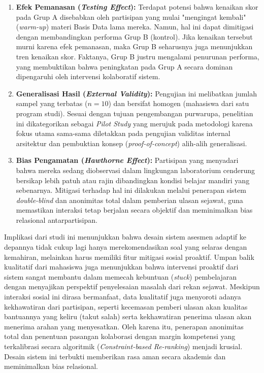 \begin{enumerate}
    \item \textbf{Efek Pemanasan (\textit{Testing Effect}):} Terdapat potensi bahwa kenaikan skor pada Grup A disebabkan oleh partisipan yang mulai "mengingat kembali" (\textit{warm-up}) materi Basis Data lama mereka. Namun, hal ini dapat dimitigasi dengan membandingkan performa Grup B (kontrol). Jika kenaikan tersebut murni karena efek pemanasan, maka Grup B seharusnya juga menunjukkan tren kenaikan skor. Faktanya, Grup B justru mengalami penurunan performa, yang membuktikan bahwa peningkatan pada Grup A secara dominan dipengaruhi oleh intervensi kolaboratif sistem.
    
    \item \textbf{Generalisasi Hasil (\textit{External Validity}):} Pengujian ini melibatkan jumlah sampel yang terbatas ($n=10$) dan bersifat homogen (mahasiswa dari satu program studi). Sesuai dengan tujuan pengembangan purwarupa, penelitian ini dikategorikan sebagai \textit{Pilot Study} yang merujuk pada metodologi \textcite{Sukserm2024} karena fokus utama sama-sama diletakkan pada pengujian validitas internal arsitektur dan pembuktian konsep (\textit{proof-of-concept}) alih-alih generalisasi.
    
    \item \textbf{Bias Pengamatan (\textit{Hawthorne Effect}):} Partisipan yang menyadari bahwa mereka sedang diobservasi dalam lingkungan laboratorium cenderung bersikap lebih patuh atau rajin dibandingkan kondisi belajar mandiri yang sebenarnya. Mitigasi terhadap hal ini dilakukan melalui penerapan sistem \textit{double-blind} dan anonimitas total dalam pemberian ulasan sejawat, guna memastikan interaksi tetap berjalan secara objektif dan meminimalkan bias relasional antarpartisipan.
\end{enumerate}

Implikasi dari studi ini menunjukkan bahwa desain sistem asesmen adaptif ke depannya tidak cukup lagi hanya merekomendasikan soal yang selaras dengan kemahiran, melainkan harus memiliki fitur mitigasi sosial proaktif. Umpan balik kualitatif dari mahasiswa juga menunjukkan bahwa intervensi proaktif dari sistem sangat membantu dalam memecah kebuntuan (\textit{stuck}) pembelajaran dengan menyajikan perspektif penyelesaian masalah dari rekan sejawat. Meskipun interaksi sosial ini dirasa bermanfaat, data kualitatif juga menyoroti adanya kekhawatiran dari partisipan, seperti kecemasan pemberi ulasan akan kualitas bantuannya yang keliru (takut salah) serta kekhawatiran penerima ulasan akan menerima arahan yang menyesatkan. Oleh karena itu, penerapan anonimitas total dan penentuan pasangan kolaborasi dengan margin kompetensi yang terkalibrasi secara algoritmik (\textit{Constraint-based Re-ranking}) menjadi krusial. Desain sistem ini terbukti memberikan rasa aman secara akademis dan meminimalkan bias relasional.
